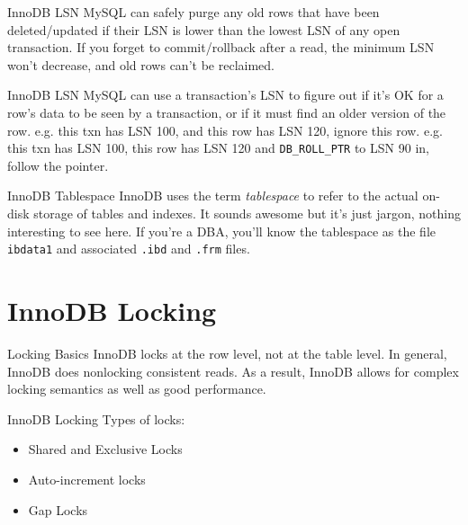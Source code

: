 \documentclass[14pt]{beamer}
\newcommand{\myitem}{\item[\textbullet]}
\begin{document}
\begin{frame}{InnoDB LSN}
  MySQL can safely purge any old rows that have been deleted/updated if their
  LSN is lower than the lowest LSN of any open transaction.
  \newline
  \newline
  If you forget to commit/rollback after a read, the minimum LSN won't decrease,
  and old rows can't be reclaimed.
\end{frame}

\begin{frame}{InnoDB LSN}
  MySQL can use a transaction's LSN to figure out if it's OK for a row's data to
  be seen by a transaction, or if it must find an older version of the
  row.
  \pause
  \newline
  \newline
  e.g. this txn has LSN 100, and this row has LSN 120, ignore this row.
  \pause
  \newline
  \newline
  e.g. this txn has LSN 100, this row has LSN 120 and \texttt{DB\_ROLL\_PTR} to
  LSN 90 in, follow the pointer.
\end{frame}

\begin{frame}{InnoDB Tablespace}
  InnoDB uses the term \emph{tablespace} to refer to the actual on-disk storage
  of tables and indexes. It sounds awesome but it's just jargon, nothing
  interesting to see here.
  \newline
  \newline
  If you're a DBA, you'll know the tablespace as the file \texttt{ibdata1} and
  associated \texttt{.ibd} and \texttt{.frm} files.
\end{frame}

\section{InnoDB Locking}
\begin{frame}{Locking Basics}
  InnoDB locks at the row level, not at the table level. In general, InnoDB does
  nonlocking consistent reads. As a result, InnoDB allows for complex locking
  semantics as well as good performance.
\end{frame}

\begin{frame}{InnoDB Locking}
  Types of locks:
  \begin{itemize}
    \myitem Shared and Exclusive Locks
    \myitem Auto-increment locks
    \myitem Gap Locks
  \end{itemize}
\end{frame}
\end{document}
